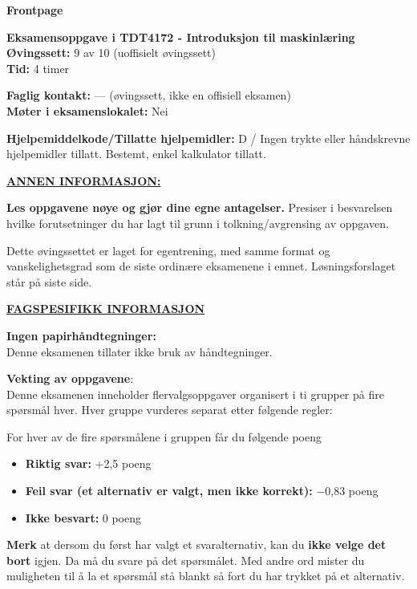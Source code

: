 \documentclass[11pt,a4paper]{article}
\begin{document}
\noindent\hspace*{-1.55em}%
{\sffamily\bfseries\fontsize{18}{22}\selectfont Frontpage}\par\vspace{1.1em}

{\bfseries Eksamensoppgave i TDT4172 - Introduksjon til maskinlæring}\\
{\bfseries Øvingssett:} 9 av 10 (uoffisielt øvingssett)\\
{\bfseries Tid:} 4 timer

\vspace{0.6em}
{\bfseries Faglig kontakt:} --- (øvingssett, ikke en offisiell eksamen)\\
{\bfseries Møter i eksamenslokalet:} Nei

\vspace{0.6em}
{\bfseries Hjelpemiddelkode/Tillatte hjelpemidler:} D / Ingen trykte eller håndskrevne hjelpemidler tillatt.
Bestemt, enkel kalkulator tillatt.

\vspace{0.6em}
{\bfseries\underline{ANNEN INFORMASJON:}}

\vspace{0.4em}
{\bfseries Les oppgavene nøye og gjør dine egne antagelser.} Presiser i besvarelsen hvilke forutsetninger du
har lagt til grunn i tolkning/avgrensing av oppgaven.

Dette øvingssettet er laget for egentrening, med samme format og vanskelighetsgrad som de
siste ordinære eksamenene i emnet. Løsningsforslaget står på siste side.

\vspace{1.6em}
{\bfseries\underline{FAGSPESIFIKK INFORMASJON}}

\vspace{0.4em}
{\bfseries Ingen papirhåndtegninger:}\\
Denne eksamenen tillater ikke bruk av håndtegninger.

\vspace{1.4em}
{\bfseries Vekting av oppgavene}:\\
Denne eksamenen inneholder flervalgsoppgaver organisert i ti grupper på fire spørsmål hver. Hver
gruppe vurderes separat etter følgende regler:

\vspace{0.6em}
For hver av de fire spørsmålene i gruppen får du følgende poeng
\begin{itemize}[leftmargin=2.2em,label=\textperiodcentered,itemsep=0pt]
\item {\bfseries Riktig svar:} +2,5 poeng
\item {\bfseries Feil svar (et alternativ er valgt, men ikke korrekt):} $-$0,83 poeng
\item {\bfseries Ikke besvart:} 0 poeng
\end{itemize}
{\bfseries Merk} at dersom du først har valgt et svaralternativ, kan du {\bfseries ikke velge det bort} igjen. Da må du
svare på det spørsmålet. Med andre ord mister du muligheten til å la et spørsmål stå blankt så fort
du har trykket på et alternativ.
\end{document}
